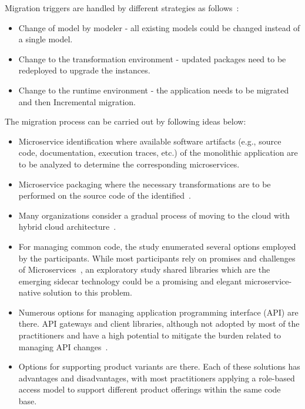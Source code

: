 Migration triggers are handled by different strategies as follows~\cite{overeem2018}:
\begin{itemize}
  \item Change of model by modeler - all existing models could be changed instead of a single model.
  \item Change to the transformation environment - updated packages need to be redeployed to upgrade the instances.
  \item Change to the runtime environment - the application needs to be migrated and then Incremental migration. 
\end{itemize}

\par The migration process can be carried out by following ideas below:
\begin{itemize}
  \item Microservice identification where available software artifacts (e.g., source code, documentation, execution traces, etc.) of the monolithic application are to be analyzed to determine the corresponding microservices.
  \item Microservice packaging where the necessary transformations are to be performed on the source code of the identified~\cite{selmadji2020}.
  \item Many organizations consider a gradual process of moving to the cloud with hybrid cloud architecture~\cite{Mikail2020}.
  \item For managing common code, the study enumerated several options employed by the participants. While most participants rely on promises and challenges of Microservices~\cite{wang2020}, an exploratory study shared libraries which are the emerging sidecar technology could be a promising and elegant microservice-native solution to this problem. 
  \item Numerous options for managing application programming interface (API) are there. API gateways and client libraries, although not adopted by most of the practitioners and have a high potential to mitigate the burden related to managing API changes~\cite{wang2020}. 
  \item Options for supporting product variants are there. Each of these solutions has advantages and disadvantages, with most practitioners applying a role-based access model to support different product offerings within the same code base. 
\end{itemize}


